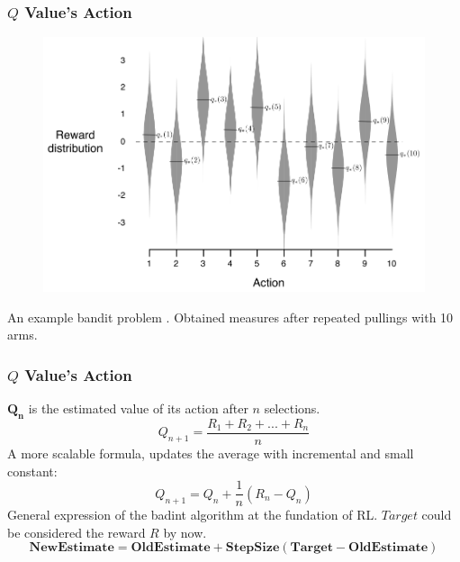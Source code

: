 \documentclass[aspectratio=169]{beamer}
\begin{document}
\begin{frame}
	\frametitle{\begin{math} Q \end{math} Value's Action}
	\begin{figure}[t!]
		\centering
		\includegraphics[scale=0.20]{img/bandit-reward-dist.png}
	\end{figure}
	An example bandit problem \cite{Montague1999}. Obtained measures after repeated pullings with 10 arms.
\end{frame}

\begin{frame}
	\frametitle{\begin{math} Q \end{math} Value's Action}
	\begin{math} \mathbf{Q_n} \end{math} is the estimated value of its action after $ n $ selections.	
	$$ Q_{n+1} = \frac{R_1 +R_2 + ... +R_{n}}{n} $$
	A more scalable formula, updates the average with incremental and small constant:
	$$ Q_{n+1} = Q_n + \frac{1}{n}(R_n-Q_n)$$
	General expression of the badint algorithm at the fundation of RL. \begin{math}Target\end{math} could be considered the reward $ R $ by now.
	$$ \mathbf{NewEstimate = OldEstimate + StepSize(Target-OldEstimate)}$$
\end{frame}
\end{document}
